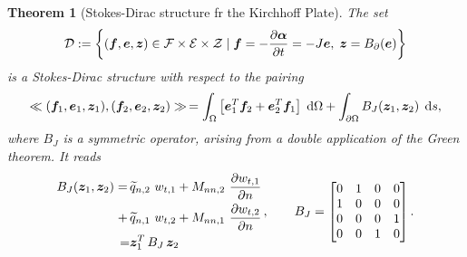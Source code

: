 \documentclass[11pt]{article}
\newtheorem{theorem}{Theorem}
\begin{document}
	\begin{theorem}[Stokes-Dirac structure fr the Kirchhoff Plate]
		The set
		\begin{equation}
		\mathcal{D} := \left\{ (\bm{f},\bm{e},\bm{z}) \in \mathcal{F}\times\mathcal{E}\times\mathcal{Z} \; | \; \bm{f}= - \diffp{\bm{\alpha}}{t} = -J \bm{e}, \; \bm{z} = B_{\partial}(\bm{e}) \right\}
		\end{equation} 
		is a Stokes-Dirac structure with respect to the pairing
		\begin{equation}
		\ll (\bm{f}_1, \bm{e}_1, \bm{z}_1), (\bm{f}_2, \bm{e}_2, \bm{z}_2) \gg  \,= \int_{\Omega} \left[ \bm{e}_1^T \bm{f}_2 + \bm{e}_2^T \bm{f}_1 \right] \d{\Omega}  + \int_{\partial \Omega} B_J(\bm{z}_1, \bm{z}_2) \, \d{s},
		\end{equation}
		where $B_J$ is a symmetric operator, arising from a double application of the Green theorem. It reads
		\begin{equation}
		\begin{aligned}
		B_J(\bm{z}_1,\bm{z}_2) = \, &\widetilde{q}_{n, 2} \ w_{t, 1} + M_{nn, 2} \ \diffp{w_{t, 1}}{n} \\
		+ \, &\widetilde{q}_{n, 1} \ w_{t, 2} + M_{nn, 1} \ \diffp{w_{t, 2}}{n} \\
		= &\bm{z}_1^T \, B_J \, \bm{z}_2 \\
		\end{aligned} \, , \qquad	B_J = 
		\begin{bmatrix}
		0 & 1 & 0 & 0 \\
		1 & 0 & 0 & 0 \\
		0 & 0 & 0 & 1 \\
		0 & 0 & 1 & 0 \\ 
		\end{bmatrix}.
		\end{equation}
	\end{theorem}
\end{document}
